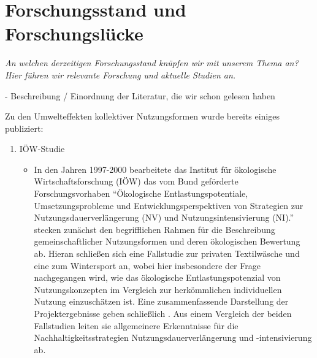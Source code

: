\documentclass[11pt, titlepage=true]{scrartcl} %
\newcommand{\was}[1]{\small\textit{#1}}
\begin{document}
\section{Forschungsstand und Forschungslücke}
\was{An welchen derzeitigen Forschungsstand knüpfen wir mit unserem Thema an? Hier führen wir relevante Forschung und aktuelle Studien an.}

- Beschreibung / Einordnung der Literatur, die wir schon gelesen haben

Zu den Umwelteffekten kollektiver Nutzungsformen wurde bereits einiges
publiziert: 
\begin{enumerate}
     \item IÖW-Studie
       \begin{itemize}
         \item In den Jahren 1997-2000 bearbeitete das Institut für ökologische
           Wirtschaftsforschung (IÖW) das vom Bund geförderte
           Forschungsvorhaben \enquote{Ökologische Entlastungspotentiale,
             Umsetzungsprobleme und Entwicklungsperspektiven von Strategien zur
             Nutzungsdauerverlängerung (NV) und Nutzungsintensivierung (NI).}
             \textcite{scholl_produkte_1998} stecken zunächst den
             begrifflichen Rahmen für die Beschreibung gemeinschaftlicher
             Nutzungsformen und deren ökologischen Bewertung ab. Hieran
             schließen sich eine Fallstudie zur privaten Textilwäsche
             \parencite{hirschl_produkte_2000} und eine zum Wintersport
             \parencite{konrad_produkte_2000} an, wobei hier insbesondere der
             Frage nachgegangen wird, wie das ökologische Entlastungspotenzial
             von Nutzungskonzepten im Vergleich zur herkömmlichen individuellen
             Nutzung einzuschätzen ist. Eine zusammenfassende Darstellung der
             Projektergebnisse geben schließlich
             \textcite{hirschl_nachhaltige_2001}. Aus einem Vergleich der beiden
             Fallstudien leiten sie allgemeinere Erkenntnisse für die
             Nachhaltigkeitsstrategien Nutzungsdauerverlängerung und
             -intensivierung ab.
       \end{itemize}


\end{enumerate}
\end{document}
